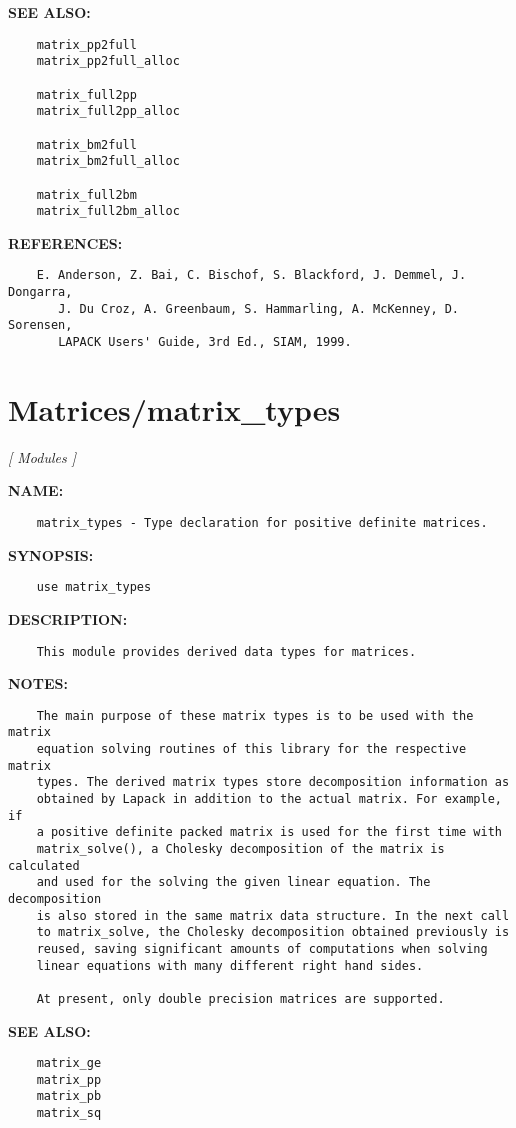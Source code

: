 \textbf{SEE ALSO:}\hspace{0.08in}\begin{Verbatim}
    matrix_pp2full
    matrix_pp2full_alloc

    matrix_full2pp
    matrix_full2pp_alloc

    matrix_bm2full
    matrix_bm2full_alloc

    matrix_full2bm
    matrix_full2bm_alloc
\end{Verbatim}
\textbf{REFERENCES:}\hspace{0.08in}\begin{Verbatim}
    E. Anderson, Z. Bai, C. Bischof, S. Blackford, J. Demmel, J. Dongarra,
       J. Du Croz, A. Greenbaum, S. Hammarling, A. McKenney, D. Sorensen,
       LAPACK Users' Guide, 3rd Ed., SIAM, 1999.
\end{Verbatim}
\section{Matrices/matrix\_types}
\textsl{[ Modules ]}

\label{ch:robo25}
\label{ch:Matrices_matrix_types}
\textbf{NAME:}\hspace{0.08in}\begin{Verbatim}
    matrix_types - Type declaration for positive definite matrices.
\end{Verbatim}
\textbf{SYNOPSIS:}\hspace{0.08in}\begin{Verbatim}
    use matrix_types
\end{Verbatim}
\textbf{DESCRIPTION:}\hspace{0.08in}\begin{Verbatim}
    This module provides derived data types for matrices.
\end{Verbatim}
\textbf{NOTES:}\hspace{0.08in}\begin{Verbatim}
    The main purpose of these matrix types is to be used with the matrix
    equation solving routines of this library for the respective matrix
    types. The derived matrix types store decomposition information as
    obtained by Lapack in addition to the actual matrix. For example, if
    a positive definite packed matrix is used for the first time with
    matrix_solve(), a Cholesky decomposition of the matrix is calculated
    and used for the solving the given linear equation. The decomposition
    is also stored in the same matrix data structure. In the next call
    to matrix_solve, the Cholesky decomposition obtained previously is
    reused, saving significant amounts of computations when solving
    linear equations with many different right hand sides.

    At present, only double precision matrices are supported.
\end{Verbatim}
\textbf{SEE ALSO:}\hspace{0.08in}\begin{Verbatim}
    matrix_ge
    matrix_pp
    matrix_pb
    matrix_sq
\end{Verbatim}
